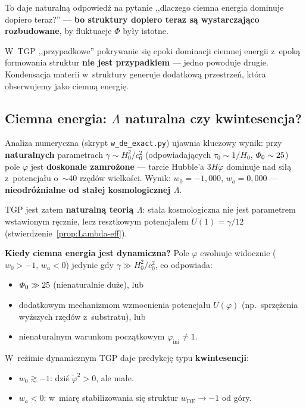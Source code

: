 To daje naturaln\k{a} odpowied\'z na pytanie ,,dlaczego ciemna
energia dominuje dopiero teraz?'' --- \textbf{bo struktury
dopiero teraz s\k{a} wystarczaj\k{a}co rozbudowane}, by
fluktuacje $\Phi$ by\l{}y istotne.

\begin{hypothesis}\label{hyp:coincidence}
W~TGP ,,przypadkowe'' pokrywanie si\k{e} epoki dominacji
ciemnej energii z~epok\k{a} formowania struktur
\textbf{nie jest przypadkiem} --- jedno powoduje drugie.
Kondensacja materii w~struktury generuje dodatkow\k{a}
przestrze\'n, kt\'ora obserwujemy jako ciemn\k{a} energi\k{e}.
\end{hypothesis}

\subsection{Ciemna energia: $\Lambda$ naturalna czy kwintesencja?}\label{ssec:de-dyn}

Analiza numeryczna (skrypt \texttt{w\_de\_exact.py})
ujawnia kluczowy wynik: przy \textbf{naturalnych} parametrach
$\gamma \sim H_0^2/c_0^2$ (odpowiadaj\k{a}cych $\tau_0 \sim 1/H_0$,
$\varPhi_0 \sim 25$) pole $\varphi$ jest \textbf{doskonale zamro\.zone}
--- tarcie Hubble'a $3H\dot\varphi$ dominuje nad si\l{}\k{a}
z~potencja\l{}u o~$\sim 40$ rz\k{e}d\'ow wielko\'sci.
Wynik: $w_0 = -1{,}000$, $w_a = 0{,}000$ ---
\textbf{nieodr\'o\.znialne od sta\l{}ej kosmologicznej $\Lambda$}.

TGP jest zatem \textbf{naturaln\k{a} teori\k{a} $\Lambda$}:
sta\l{}a kosmologiczna nie jest parametrem wstawionym r\k{e}cznie,
lecz resztkowym potencja\l{}em $U(1) = \gamma/12$
(stwierdzenie~\ref{prop:Lambda-eff}).

\medskip\noindent
\textbf{Kiedy ciemna energia jest dynamiczna?}
Pole $\varphi$ ewoluuje widocznie ($w_0 > -1$, $w_a < 0$)
jedynie gdy $\gamma \gg H_0^2/c_0^2$, co odpowiada:
\begin{itemize}[nosep]
  \item $\varPhi_0 \gg 25$ (nienaturalnie du\.ze), lub
  \item dodatkowym mechanizmom wzmocnienia potencja\l{}u
        $U(\varphi)$ (np.\ sprz\k{e}\.zenia wy\.zszych rz\k{e}d\'ow
        z~substratu), lub
  \item nienaturalnym warunkom pocz\k{a}tkowym
        $\varphi_{\mathrm{ini}} \neq 1$.
\end{itemize}
W~re\.zimie dynamicznym TGP daje predykcj\k{e} typu
\textbf{kwintesencji}:
\begin{itemize}[nosep]
  \item $w_0 \gtrsim -1$: dzi\'s $\dot{\varphi}^2 > 0$, ale ma\l{}e.
  \item $w_a < 0$: w~miar\k{e} stabilizowania si\k{e} struktur
        $w_{\mathrm{DE}} \to -1$ od g\'ory.
\end{itemize}

